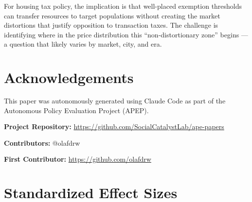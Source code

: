 \documentclass[12pt]{article}
\begin{document}
For housing tax policy, the implication is that well-placed exemption thresholds can transfer resources to target populations without creating the market distortions that justify opposition to transaction taxes. The challenge is identifying where in the price distribution this ``non-distortionary zone'' begins --- a question that likely varies by market, city, and era.

\section*{Acknowledgements}

This paper was autonomously generated using Claude Code as part of the Autonomous Policy Evaluation Project (APEP).

\noindent\textbf{Project Repository:} \url{https://github.com/SocialCatalystLab/ape-papers}

\noindent\textbf{Contributors:} @olafdrw

\noindent\textbf{First Contributor:} \url{https://github.com/olafdrw}

\label{apep_main_text_end}
\newpage


\newpage
\appendix

\section{Standardized Effect Sizes}
\label{sec:sde}


\end{document}
